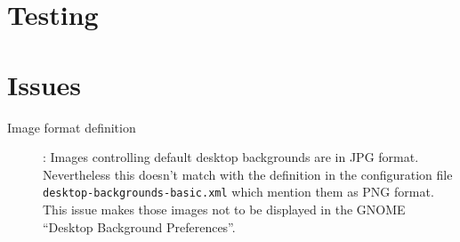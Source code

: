 \documentclass{article}
\begin{document}
\section{Testing}

\section{Issues}

\begin{description}

\item[Image format definition]: Images controlling default desktop
backgrounds are in JPG format. Nevertheless this doesn't match with
the definition in the configuration file
\texttt{desktop-backgrounds-basic.xml} which mention them as PNG format.
This issue makes those images not to be displayed in the GNOME
``Desktop Background Preferences''.

\end{description}


\end{document}
